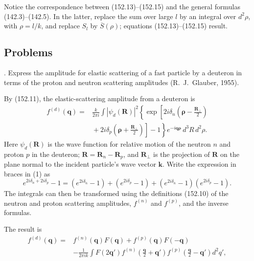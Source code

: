 Notice the correspondence between (152.13)--(152.15) and the general formulas (142.3)--(142.5). In the latter, replace the sum over large $l$ by an integral over $d^2\rho$, with $\rho=l/k$, and replace $S_l$ by $\overline S(\rho)$; equations (152.13)--(152.15) result.

\subsection*{Problems}

. Express the amplitude for elastic scattering of a fast particle by a deuteron in terms of the proton and neutron scattering amplitudes (R.~J.~Glauber, 1955).

\SolutionHeading By (152.11), the elastic-scattering amplitude from a deuteron is
\begin{equation}
 \begin{split}
 f^{(d)}(\mathbf q)={}&\frac{k}{2\pi i}\int|\psi_d(\mathbf R)|^2
 \left\{\exp\left[2i\delta_n\left(\boldsymbol\rho-\frac{\mathbf R_\perp}{2}\right)\right.\right.\\
 &\left.\left.{}+2i\delta_p\left(\boldsymbol\rho+\frac{\mathbf R_\perp}{2}\right)\right]-1\right\}
 e^{-i\mathbf q\boldsymbol\rho}\,d^3R\,d^2\rho.
 \end{split}
 \tag{1}
\end{equation}
Here $\psi_d(\mathbf R)$ is the wave function for relative motion of the neutron $n$ and proton $p$ in the deuteron; $\mathbf R=\mathbf R_n-\mathbf R_p$, and $\mathbf R_\perp$ is the projection of $\mathbf R$ on the plane normal to the incident particle's wave vector $\mathbf k$. Write the expression in braces in (1) as
\[
 e^{2i\delta_n+2i\delta_p}-1=(e^{2i\delta_n}-1)+(e^{2i\delta_p}-1)+(e^{2i\delta_n}-1)(e^{2i\delta_p}-1).
\]
The integrals can then be transformed using the definitions (152.10) of the neutron and proton scattering amplitudes, $f^{(n)}$ and $f^{(p)}$, and the inverse formulas.

The result is
\begin{equation}
 \begin{split}
 f^{(d)}(\mathbf q)={}&f^{(n)}(\mathbf q)F(\mathbf q)+f^{(p)}(\mathbf q)F(-\mathbf q)\\
 &-\frac1{2\pi ik}\int F(2\mathbf q')f^{(n)}\left(\frac{\mathbf q}{2}+\mathbf q'\right)
 f^{(p)}\left(\frac{\mathbf q}{2}-\mathbf q'\right)d^2q',
 \end{split}
 \tag{2}
\end{equation}

